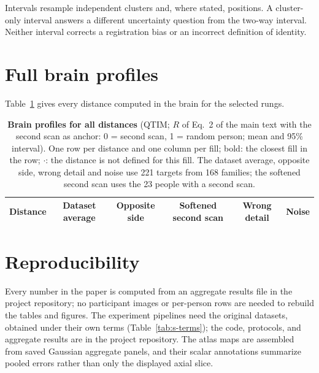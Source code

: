 Intervals resample independent clusters and, where stated, positions.
A cluster-only interval answers a different uncertainty question from the two-way interval.
Neither interval corrects a registration bias or an incorrect definition of identity.

\section{Full brain profiles}
Table~\ref{tab:s-brain-full} gives every distance computed in the brain for the selected rungs.

\begin{table}[htbp]
\centering
\caption{\textbf{Brain profiles for all distances} (QTIM; $R$ of Eq.~2 of the main text with the second scan as anchor: 0 = second scan, 1 = random person; mean and 95\% interval).
One row per distance and one column per fill; bold: the closest fill in the row; $\cdot$: the distance is not defined for this fill.
The dataset average, opposite side, wrong detail and noise use 221 targets from 168 families; the softened second scan uses the 23 people with a second scan.}
\label{tab:s-brain-full}
\footnotesize
\setlength{\tabcolsep}{5pt}
\begin{tabular}{@{}lccccc@{}}
\toprule
Distance & Dataset average & Opposite side & Softened second scan & Wrong detail & Noise \\
\midrule
\end{tabular}
\end{table}







\section{Reproducibility}
Every number in the paper is computed from an aggregate results file in the project repository; no participant images or per-person rows are needed to rebuild the tables and figures.
The experiment pipelines need the original datasets, obtained under their own terms (Table~\ref{tab:s-terms}); the code, protocols, and aggregate results are in the project repository.
The atlas maps are assembled from saved Gaussian aggregate panels, and their scalar annotations summarize pooled errors rather than only the displayed axial slice.
